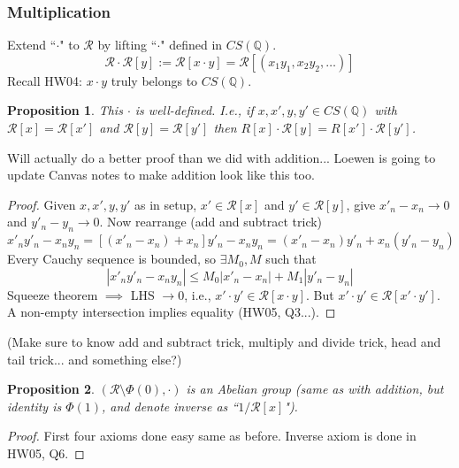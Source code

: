 \documentclass{article}
\theoremstyle{plain}
\newtheorem{proposition}{Proposition}
\theoremstyle{remark}
\newcommand{\Q}{{\mathbb Q}}
\begin{document}
\subsubsection{Multiplication}
Extend ``$\cdot$" to $\mathcal{R}$ by lifting ``$\cdot$" defined in $CS(\Q)$.
\[
	\mathcal{R}\cdot\mathcal{R}[y] := \mathcal{R}[x\cdot y] =
	\mathcal{R}[(x_1y_1, x_2y_2, \dots)]
\]
Recall HW04: $x\cdot y$ truly belongs to $CS(\Q)$.
\begin{proposition}
	This $\cdot$ is well-defined.
	I.e., if $x,x',y,y' \in CS(\Q)$ with $\mathcal{R}[x] = \mathcal{R}[x']$
	and $\mathcal{R}[y] = \mathcal{R}[y']$ then
	$R[x] \cdot \mathcal{R}[y] = R[x'] \cdot \mathcal{R}[y']$.
\end{proposition}
Will actually do a better proof than we did with addition...
Loewen is going to update Canvas notes to make addition look like this too.
\begin{proof}
	Given $x,x',y,y'$ as in setup,
	$x' \in \mathcal{R}[x]$ and $y' \in \mathcal{R}[y]$,
	give $x'_n - x_n \to 0$ and $y'_n - y_n \to 0$.
	Now rearrange (add and subtract trick)
	\[
		x'_ny'_n - x_ny_n = [(x'_n-x_n) + x_n]y'_n - x_ny_n
		= (x'_n - x_n)y'_n + x_n(y'_n - y_n)
	\]
	Every Cauchy sequence is bounded, so $\exists M_0,M$ such that
	\[
		|x'_ny'_n - x_ny_n| \leq M_0|x'_n - x_n| + M_1|y'_n - y_n|
	\]
	Squeeze theorem $\implies$ LHS $\to 0$, i.e., $x'\cdot y' \in \mathcal{R}[x\cdot y]$.
	But $x'\cdot y' \in \mathcal{R}[x' \cdot y']$.
	A non-empty intersection implies equality (HW05, Q3...).
\end{proof}
(Make sure to know add and subtract trick,
multiply and divide trick,
head and tail trick... and something else?)

\begin{proposition}
	$(\mathcal{R}\setminus \Phi(0), \cdot)$ is an Abelian group
	(same as with addition, but identity is $\Phi(1)$,
	and denote inverse as ``$1/\mathcal{R}[x]$").
\end{proposition}
\begin{proof}
	First four axioms done easy same as before.
	Inverse axiom is done in HW05, Q6.
\end{proof}
\end{document}
